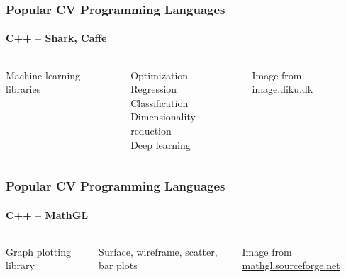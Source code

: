 \documentclass[xetex,professionalfont]{beamer}
\begin{document}

\begin{frame}
\frametitle{Popular CV Programming Languages}
\framesubtitle{C++ -- Shark, Caffe}

\begin{columns}

Machine learning libraries

\bigskip
Optimization\\\medskip
Regression\\\medskip
Classification\\\medskip
Dimensionality reduction\\\medskip
Deep learning


\begin{center}
{
	{\centering Image from \url{image.diku.dk}}}
\end{center}

\end{columns}

\end{frame}


\begin{frame}
\frametitle{Popular CV Programming Languages}
\framesubtitle{C++ -- MathGL}

\begin{columns}

Graph plotting library

\bigskip
Surface, wireframe, scatter, bar plots


\begin{center}
{
	{\centering Image from \url{mathgl.sourceforge.net}}}
\end{center}

\end{columns}

\end{frame}
\end{document}
